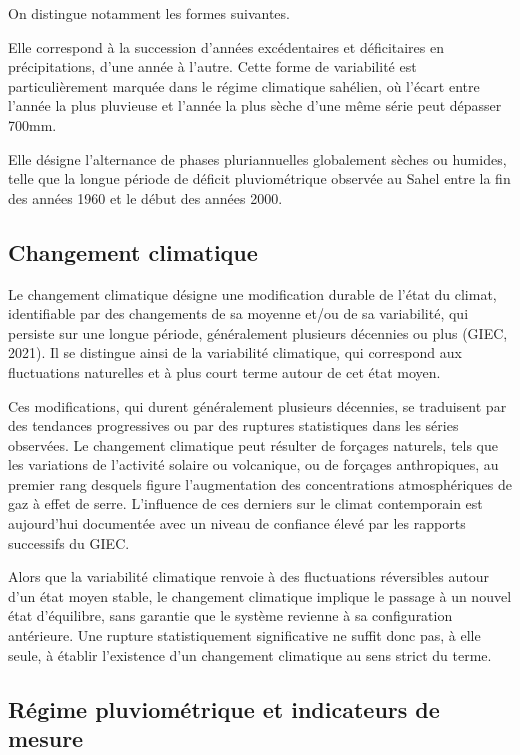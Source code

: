 On distingue notamment les formes suivantes.

Elle correspond à la succession d’années excédentaires et déficitaires en précipitations, d’une année à l’autre. Cette forme de variabilité est particulièrement marquée dans le régime climatique sahélien, où l’écart entre l’année la plus pluvieuse et l’année la plus sèche d’une même série peut dépasser 700mm.

Elle désigne l'alternance de phases pluriannuelles globalement sèches ou humides, telle que la longue période de déficit pluviométrique observée au Sahel entre la fin des années 1960 et le début des années 2000.

\subsection{Changement climatique}

Le changement climatique désigne une modification durable de l’état du climat, identifiable par des changements de sa moyenne et/ou de sa variabilité, qui persiste sur une longue période, généralement plusieurs décennies ou plus (GIEC, 2021). Il se distingue ainsi de la variabilité climatique, qui correspond aux fluctuations naturelles et à plus court terme autour de cet état moyen.

Ces modifications, qui durent généralement plusieurs décennies, se traduisent par des tendances progressives ou par des ruptures statistiques dans les séries observées. Le changement climatique peut résulter de forçages naturels, tels que les variations de l'activité solaire ou volcanique, ou de forçages anthropiques, au premier rang desquels figure l'augmentation des concentrations atmosphériques de gaz à effet de serre. L'influence de ces derniers sur le climat contemporain est aujourd'hui documentée avec un niveau de confiance élevé par les rapports successifs du GIEC.

Alors que la variabilité climatique renvoie à des fluctuations réversibles autour d'un état moyen stable, le changement climatique implique le passage à un nouvel état d'équilibre, sans garantie que le système revienne à sa configuration antérieure. Une rupture statistiquement significative ne suffit donc pas, à elle seule, à établir l'existence d'un changement climatique au sens strict du terme.

\subsection{Régime pluviométrique et indicateurs de mesure}

